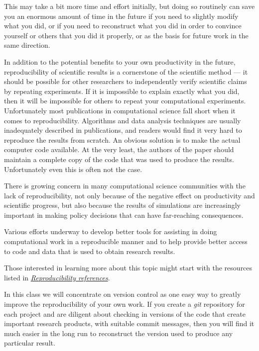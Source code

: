 \documentclass[letterpaper,10pt,english]{sphinxmanual}
\begin{document}
This may take a bit more time and effort initially, but doing so routinely
can save you an enormous amount of time in the future if you need to
slightly modify what you did, or if you need to reconstruct what you did
in order to convince yourself or others that you did it properly, or as the
basis for future work in the same direction.

In addition to the potential benefits to your own productivity in the
future, reproducibility of scientific results is a cornerstone of the
scientific method --- it should be possible for other researchers to
independently verify scientific claims by repeating experiments.  If it is
impossible to explain exactly what you did, then it will be impossible for
others to repeat your computational experiments.  Unfortunately most
publications in computational science fall short when it comes to
reproducibility.  Algorithms and data analysis techniques are usually
inadequately described in publications, and readers would find it very hard
to reproduce the results from scratch.  An obvious solution is to make the
actual computer code available.  At the very least, the authors of the paper
should maintain a complete copy of the code that was used to produce the
results.  Unfortunately even this is often not the case.

There is growing concern in many computational science communities with the
lack of reproducibility, not only because of the negative effect on
productivity and scientific progress, but also because the results of
simulations are increasingly important in making policy decisions that can
have far-reaching consequences.

Various efforts underway to develop better tools
for assisting in doing computational work in a reproducible manner and to
help provide better access to code and data that is used to obtain
research results.

Those interested in learning more about this topic might start with the
resources listed in {\hyperref[biblio:biblio-repro]{\emph{Reproducibility references}}}.

In this class we will concentrate on version control as one easy way to
greatly improve the reproducibility of your own work.  If you create a \emph{git}
repository for each project and are diligent about checking in versions of
the code that create important research products, with suitable commit
messages, then you will find it much easier in the long run to reconstruct
the version used to produce any particular result.
\end{document}
